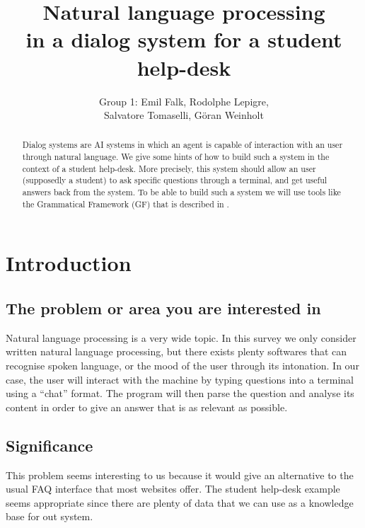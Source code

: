 \documentclass[a4paper,11pt]{article}
\begin{document}
\title{Natural language processing\\
in a dialog system for a student help-desk} %
\author{Group 1: Emil Falk, Rodolphe Lepigre,\\
        Salvatore Tomaselli, G\"oran Weinholt}
\maketitle
\begin{abstract}\centering
Dialog systems are AI systems in which an agent is capable of interaction with
an user through natural language. We give some hints of how to build such a
system in the context of a student help-desk. More precisely, this system
should allow an user (supposedly a student) to ask specific questions through
a terminal, and get useful answers back from the system. To be able to build
such a system we will use tools like the Grammatical Framework (GF) that is
described in \cite{ranta-2011}.
\end{abstract}

\section{Introduction}
\subsection{The problem or area you are interested in}
Natural language processing is a very wide topic. In this survey we only
consider written natural language processing, but there exists plenty softwares
that can recognise spoken language, or the mood of the user through its
intonation. In our case, the user will interact with the machine by typing
questions into a terminal using a ``chat'' format. The program will then parse
the question and analyse its content in order to give an answer that is as
relevant as possible.

\subsection{Significance}
This problem seems interesting to us because it would give an alternative to
the usual FAQ interface that most websites offer. The student help-desk example
seems appropriate since there are plenty of data that we can use as a knowledge
base for out system.
\end{document}
